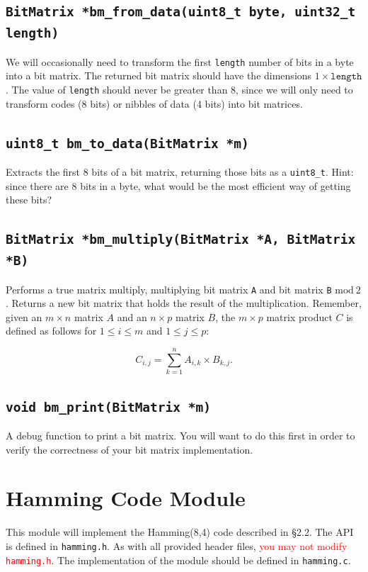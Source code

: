 \documentclass[11pt]{article}
\begin{document}
\subsection{\texttt{BitMatrix *bm\_from\_data(uint8\_t byte, uint32\_t length)}}

We will occasionally need to transform the first \texttt{length} number
of bits in a byte into a bit matrix. The returned bit matrix should have
the dimensions $1 \times \texttt{length}$. The value of \texttt{length}
should never be greater than 8, since we will only need to transform
codes (8 bits) or nibbles of data (4 bits) into bit matrices.

\subsection{\texttt{uint8\_t bm\_to\_data(BitMatrix *m)}}

Extracts the first 8 bits of a bit matrix, returning those bits as a
\texttt{uint8\_t}. Hint: since there are 8 bits in a byte, what would be
the most efficient way of getting these bits?

\subsection{\texttt{BitMatrix *bm\_multiply(BitMatrix *A, BitMatrix *B)}}

Performs a true matrix multiply, multiplying bit matrix \texttt{A} and
bit matrix \texttt{B} $\mathrm{mod}\ 2$. Returns a new bit matrix that
holds the result of the multiplication. Remember, given an $m \times n$
matrix $A$  and an $n \times p$ matrix $B$, the $m \times p$ matrix
product $C$ is defined as follows for $1 \le i \le m$ and $1 \le j
\le p$:

\[
  C_{i,j} = \sum_{k = 1}^{n} A_{i,k} \times B_{k,j}.
\]

\subsection{\texttt{void bm\_print(BitMatrix *m)}}

A debug function to print a bit matrix. You will want to do this first
in order to verify the correctness of your bit matrix implementation.

\section{Hamming Code Module}

This module will implement the Hamming(8,4) code described in \S 2.2.
The API is defined in \texttt{hamming.h}. As with all provided header
files, \textcolor{red}{you may not modify \texttt{hamming.h}}. The
implementation of the module should be defined in \texttt{hamming.c}.
\end{document}
